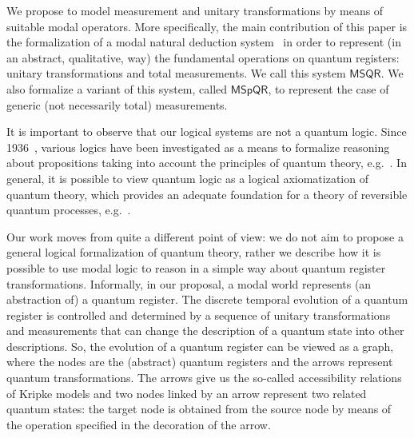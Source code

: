 \documentclass[times, 10pt]{article}
\newcommand{\MSQR}{\textsf{MSQR}}
\newcommand{\MSpQR}{\textsf{MSpQR}}
\begin{document}
We propose to model measurement and unitary transformations by means of suitable modal 
operators. More specifically, the main contribution of this paper is the formalization of 
a modal natural deduction system~\cite{Prawitz65,TroelstraSchwichtenberg96} 
in order to represent (in an abstract, qualitative, way) the fundamental operations on quantum registers: unitary transformations and total measurements. We call this system $\MSQR$. We also formalize a variant of this system, called $\MSpQR$, to represent the case of generic (not necessarily total) measurements. 

It is important to observe that our logical systems are not a quantum
logic. Since 1936~\cite{vN36}, various logics have been investigated
as a means to formalize reasoning about propositions taking into account
the principles of quantum theory,
e.g.~\cite{DallaCh77,DallaChiara86}. In general, it is
possible to view quantum logic as a logical axiomatization of quantum
theory, which provides an adequate foundation for a theory of
reversible quantum processes,
e.g.~\cite{AbDu06,BaltSmets04,BalSmets06,Mittel79}.

Our work moves from quite a different point of view: we do not aim to propose a general logical formalization of quantum theory, rather we describe how it is possible to use modal logic to
reason in a simple way about quantum register transformations.  
Informally, in our proposal, a modal world represents (an abstraction of) a quantum register.
The discrete temporal evolution of a quantum register is controlled and determined by a 
sequence of unitary transformations and measurements that can change the description of a
quantum state into other descriptions. So, the evolution of a quantum register can be viewed as 
a graph, where the nodes are the (abstract) quantum registers and the arrows represent quantum transformations. The arrows give us the so-called accessibility relations of Kripke models and two
nodes linked by an arrow represent two related quantum states: the target node is obtained from
the source node by means of the operation specified in the decoration of the arrow.
\end{document}
